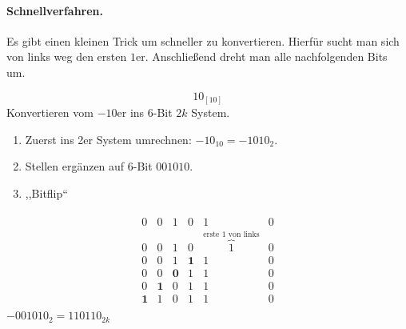 \documentclass{article}
\begin{document}
\paragraph{Schnellverfahren.}
Es gibt einen kleinen Trick um schneller zu konvertieren.
Hierfür sucht man sich von links weg den ersten $1$er.
Anschließend dreht man alle nachfolgenden Bits um.

\begin{question}
    \begin{equation*}
        10_{[10]}
    \end{equation*}
    Konvertieren vom $-10$er ins 6-Bit $2k$ System.
\end{question}


\begin{answer}[Schnellverfahren]
    \begin{enumerate}[(1)]
        \item  Zuerst ins 2er System umrechnen: $-10_{10}=-1010_{2}$.
        \item   Stellen ergänzen auf 6-Bit $001010$.
        \item   ,,Bitflip``
    \end{enumerate}
    \begin{align*}
        \begin{array}{cccccc}
            0           & 0           & 1           & 0           & 1                                                 & 0 \\
            0           & 0           & 1           & 0           & \overset{\text{erste 1 von links}}{\overbrace{1}} & 0 \\
            0           & 0           & 1           & \mathbf {1} & 1                                                 & 0 \\
            0           & 0           & \mathbf {0} & 1           & 1                                                 & 0 \\
            0           & \mathbf {1} & 0           & 1           & 1                                                 & 0 \\
            \mathbf {1} & 1           & 0           & 1           & 1                                                 & 0
        \end{array}
    \end{align*}
    $ -001010_{2} =  110110_{2k}$
\end{answer}
\end{document}
